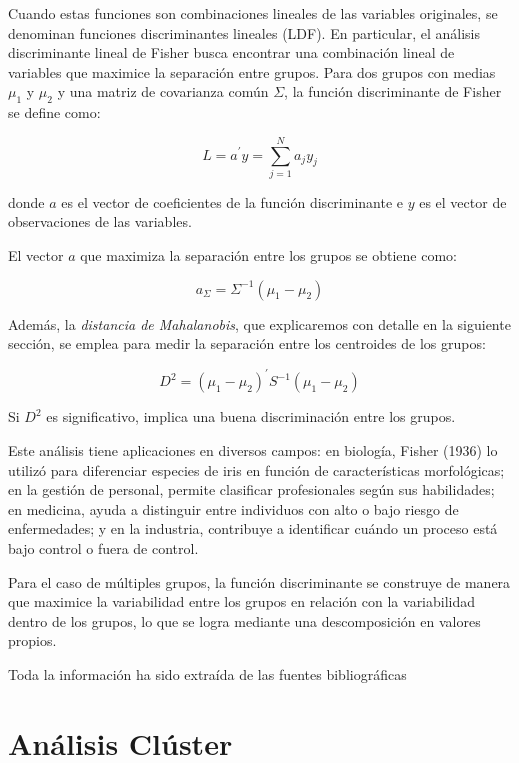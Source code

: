 Cuando estas funciones son combinaciones lineales de las variables originales, se denominan funciones discriminantes lineales (LDF). En
particular, el análisis discriminante lineal de Fisher busca encontrar una combinación lineal de variables que maximice la separación
entre grupos. Para dos grupos con medias $\mu_{1}$ y $\mu_{2}$ y una matriz de covarianza común $\Sigma$, la función discriminante de Fisher
se define como:

\[
L = a^{'}y = \sum_{j=1}^{N} a_{j}y_{j}
\]

donde $a$ es el vector de coeficientes de la función discriminante e $y$ es el vector de observaciones de las variables. \newline

El vector $a$ que maximiza la separación entre los grupos se obtiene como:

\[
a_{\Sigma} = \Sigma^{-1}(\mu_{1}-\mu_{2})
\]

Además, la \textit{distancia de Mahalanobis}, que explicaremos con detalle en la siguiente sección, se emplea para medir la separación entre
los centroides de los grupos:

\[
D^{2} = (\mu_{1}-\mu_{2})^{'}S^{-1}(\mu_{1}-\mu_{2})
\]

Si $D^{2}$ es significativo, implica una buena discriminación entre los grupos. \newline

Este análisis tiene aplicaciones en diversos campos: en biología, Fisher (1936) lo utilizó para diferenciar especies de iris en función de
características morfológicas; en la gestión de personal, permite clasificar profesionales según sus habilidades; en medicina, ayuda a distinguir
entre individuos con alto o bajo riesgo de enfermedades; y en la industria, contribuye a identificar cuándo un proceso está bajo control o fuera 
de control. \newline

Para el caso de múltiples grupos, la función discriminante se construye de manera que maximice la variabilidad entre los grupos en relación con 
la variabilidad dentro de los grupos, lo que se logra mediante una descomposición en valores propios. \newline

Toda la información ha sido extraída de las fuentes bibliográficas \cite{bejar-PCA, bejar-AF, Bib-5, Bib-6} %

\section{Análisis Clúster}

